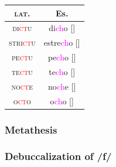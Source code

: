\documentclass{report}[12pt]
\begin{document}
\begin{tcolorbox}

\end{tcolorbox}

\begin{tabular}{c c}
  \textsc{lat.} & Es. \\
  \hline
  \textsc{di\textcolor{red}{ct}u} & di\textcolor{magenta}{ch}o [\textipa{\textteshlig}] \\
  \textsc{stri\textcolor{red}{ct}u} & estre\textcolor{magenta}{ch}o [\textipa{\textteshlig}] \\
  \textsc{pe\textcolor{red}{ct}u} & pe\textcolor{magenta}{ch}o [\textipa{\textteshlig}] \\
  \textsc{te\textcolor{red}{ct}u} & te\textcolor{magenta}{ch}o [\textipa{\textteshlig}] \\
  \textsc{no\textcolor{red}{ct}e} & no\textcolor{magenta}{ch}e [\textipa{\textteshlig}] \\
  \textsc{o\textcolor{red}{ct}o} & o\textcolor{magenta}{ch}o [\textipa{\textteshlig}] \\
\end{tabular}

\subsubsection*{Metathesis}

\begin{tcolorbox}

\end{tcolorbox}

\subsubsection*{Debuccalization of /f/}

\begin{tcolorbox}
  
\end{tcolorbox}
\end{document}
